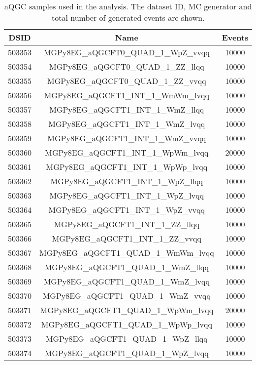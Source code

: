 \begin{table}[!htbp]
\begin{center}
\small
\caption{
aQGC samples used in the analysis. The dataset ID, MC generator and total number of generated events are shown.
}
\begin{tabular}{c|c|c}
\hline

\hline
DSID & Name & Events  \\
\hline

503353 & MGPy8EG\_aQGCFT0\_QUAD\_1\_WpZ\_vvqq    & 10000 \\
503354 & MGPy8EG\_aQGCFT0\_QUAD\_1\_ZZ\_llqq     & 10000 \\
503355 & MGPy8EG\_aQGCFT0\_QUAD\_1\_ZZ\_vvqq     & 10000 \\
503356 & MGPy8EG\_aQGCFT1\_INT\_1\_WmWm\_lvqq    & 10000 \\
503357 & MGPy8EG\_aQGCFT1\_INT\_1\_WmZ\_llqq     & 10000 \\
503358 & MGPy8EG\_aQGCFT1\_INT\_1\_WmZ\_lvqq     & 10000 \\
503359 & MGPy8EG\_aQGCFT1\_INT\_1\_WmZ\_vvqq     & 10000 \\
503360 & MGPy8EG\_aQGCFT1\_INT\_1\_WpWm\_lvqq    & 20000 \\
503361 & MGPy8EG\_aQGCFT1\_INT\_1\_WpWp\_lvqq    & 10000 \\
503362 & MGPy8EG\_aQGCFT1\_INT\_1\_WpZ\_llqq     & 10000 \\
503363 & MGPy8EG\_aQGCFT1\_INT\_1\_WpZ\_lvqq     & 10000 \\
503364 & MGPy8EG\_aQGCFT1\_INT\_1\_WpZ\_vvqq     & 10000 \\
503365 & MGPy8EG\_aQGCFT1\_INT\_1\_ZZ\_llqq      & 10000 \\
503366 & MGPy8EG\_aQGCFT1\_INT\_1\_ZZ\_vvqq      & 10000 \\
503367 & MGPy8EG\_aQGCFT1\_QUAD\_1\_WmWm\_lvqq   & 10000 \\
503368 & MGPy8EG\_aQGCFT1\_QUAD\_1\_WmZ\_llqq    & 10000 \\
503369 & MGPy8EG\_aQGCFT1\_QUAD\_1\_WmZ\_lvqq    & 10000 \\
503370 & MGPy8EG\_aQGCFT1\_QUAD\_1\_WmZ\_vvqq    & 10000 \\
503371 & MGPy8EG\_aQGCFT1\_QUAD\_1\_WpWm\_lvqq   & 20000 \\
503372 & MGPy8EG\_aQGCFT1\_QUAD\_1\_WpWp\_lvqq   & 10000 \\
503373 & MGPy8EG\_aQGCFT1\_QUAD\_1\_WpZ\_llqq    & 10000 \\
503374 & MGPy8EG\_aQGCFT1\_QUAD\_1\_WpZ\_lvqq    & 10000 \\

\end{tabular}
\end{center}
\end{table}
